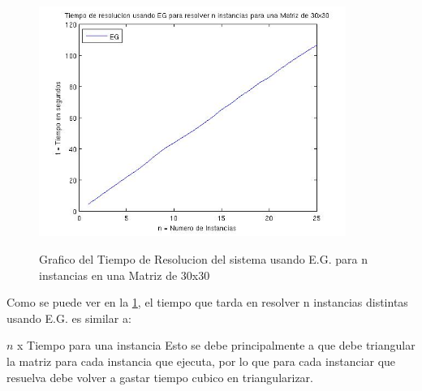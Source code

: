 \documentclass[12pt,a4paper]{article}
\begin{document}
\begin{figure}[h!]
\centering
\caption{Grafico del Tiempo de Resolucion del sistema usando E.G. para n instancias en una Matriz de 30x30}
\includegraphics[width=10cm]{tmpPara25InstEG.jpg}
\label{Exp2EG}
\end{figure}

Como se puede ver en la \ref{Exp2EG}, el tiempo que tarda en resolver n instancias distintas usando E.G. es similar a:

$n$ x Tiempo para una instancia
Esto se debe principalmente a que debe triangular la matriz para cada instancia que ejecuta, por lo que para cada instanciar que resuelva debe volver a gastar tiempo cubico en triangularizar.
\end{document}
